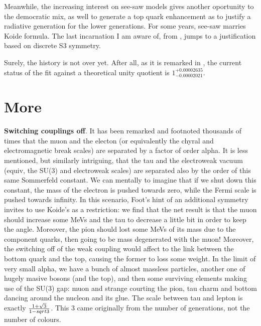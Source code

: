 \documentclass[a4paper]{article}
\begin{document}
Meanwhile, the increasing interest on see-saw models gives another
oportunity to the democratic mix, as well to generate a top quark 
enhancement as to justify a radiative generation for the lower generations.
For some years, see-saw marries Koide formula\cite{k5,k6,k7}. The last
incarnation I am aware of, from \cite{k7,k8}, jumps to a justification
based on discrete S3 symmetry. 

Surely, the history is not over yet. After all, as it is remarked in
\cite{newone}, the current status of the fit against a theoretical
unity quotient is $1^{+0.00002635}_{-0.00002021}$. 

\section{More}



{\bf Switching couplings off}. It has been remarked and footnoted thousands
of times that the muon and the electon (or equivalently the chyral and
electromagnetic break scales) are separated by a factor of order
alpha. It is less mentioned\cite{y}, but similarly intriguing, that the
tau and the electroweak vacuum (equiv, the SU(3) and electroweak scales) are
separated also by the order of this same Sommerfeld constant. We can mentally
to imagine that if we shut down this constant, the mass of the electron
is pushed towards zero, while the Fermi scale is pushed towards infinity.
In this scenario, Foot's hint of an additional symmetry invites to use
Koide's as a restriction: we find that the net result is that the muon
should increase some MeVs and the tau to decrease a little bit in order
to keep the angle. Moreover, the pion should lost some MeVs of its mass due
to the component quarks, then going to be mass degenerated with the
muon! Moreover, the switching off of the weak coupling would affect to
the link between the bottom quark and the top, causing the former to
loss some weight. In the limit of very small alpha, we have a bunch of
almost massless particles, another one of hugely masive bosons (and the top),
and then some surviving elements making use of the SU(3) gap: muon and 
strange courting the pion, tau charm and bottom dancing around the nucleon
and its glue. The scale between tau and lepton is exactly ${1 + \sqrt 3 
\over 1-sqrt 3}$. This 3 came originally from the number of generations,
not the number of colours. 
\end{document}
